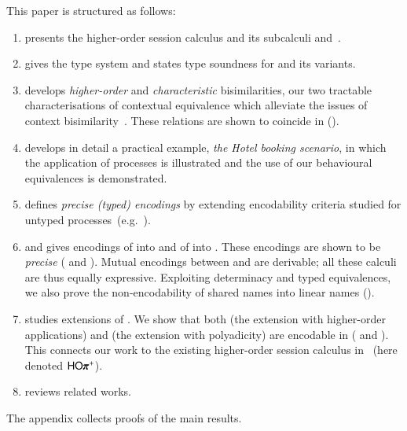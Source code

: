 \smallskip

 This paper 
is structured as follows:
%
\begin{enumerate}[$\bullet$]

	\item	{} presents the higher-order session calculus \HOp and its 
		subcalculi \HO and~\sessp. 

	\item	{} gives the type system
		and states type soundness for \HOp and its variants.

	\item	{} 
		develops \emph{higher-order} and \emph{characteristic} bisimilarities, our two
		tractable characterisations of contextual equivalence which 
		alleviate the issues of context bisimilarity~\cite{San96H}. These 
		relations are shown to coincide in \HOp ().
		
	\item {} develops in detail a practical example, \emph{the Hotel booking scenario}, 
	in which the application of \HOp processes is illustrated and the use of our behavioural equivalences is demonstrated. 

	\item	{} defines \emph{precise (typed) encodings} by extending encodability criteria 
		studied for
		untyped processes~(e.g.~\cite{DBLP:journals/iandc/Gorla10,DBLP:conf/icalp/LanesePSS10}).

	\item	{} and 
		gives encodings of \HOp into \HO and of \HOp into \sessp.
		These encodings 
		are shown to be \emph{precise} ( and ).
		Mutual encodings between \sessp and \HO are derivable; 
		all these calculi are thus equally expressive.
		Exploiting determinacy and typed equivalences,
		we also prove the non-encodability of shared names
		into linear names ().

	\item	{} studies extensions of \HOp. We show that 
		both \HOpp (the extension with higher-order applications) 
		and \pHOp (the extension with polyadicity) are encodable in \HOp
		( and ).
		This connects our work 
		to the existing
		higher-order session calculus in~\cite{tlca07} (here denoted  $\pHOpp$).

	\item	{} reviews related works.
\end{enumerate}
The appendix collects proofs of the main results.



